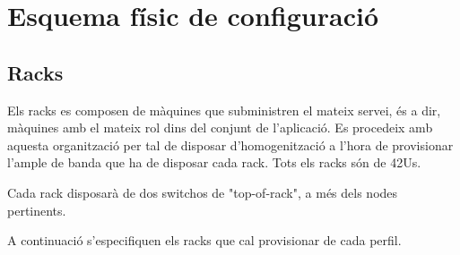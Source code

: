 \section{Esquema físic de configuració}


\subsection{Racks}

Els racks es composen de màquines que subministren el mateix servei, és a dir, màquines amb el mateix rol dins del conjunt de l'aplicació. Es procedeix amb aquesta organització per tal de disposar d'homogenització a l'hora de provisionar l'ample de banda que ha de disposar cada rack. Tots els racks són de 42Us.

Cada rack disposarà de dos switchos de "top-of-rack", a més dels nodes pertinents. 

A continuació s'especifiquen els racks que cal provisionar de cada perfil. 

